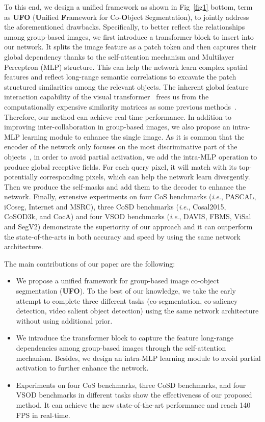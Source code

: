 \documentclass[journal]{IEEEtran}
\newcommand{\ie}{\textit{i}.\textit{e}., }
\begin{document}
To this end, we design a unified framework as shown in Fig~\ref{fig1} bottom, term as \textbf{UFO} (\textbf{U}nified \textbf{F}ramework for Co-\textbf{O}bject Segmentation), to jointly address the aforementioned drawbacks. 
Specifically, to better reflect the relationships among group-based images, we first introduce a transformer block to insert into our network. It splits the image feature as a patch token and then captures their global dependency thanks to the self-attention mechanism and Multilayer Perceptron (MLP) structure. This can help the network learn complex spatial features and reflect long-range semantic correlations to excavate the patch structured similarities among the relevant objects.
The inherent global feature interaction capability of the visual transformer~\cite{dosovitskiy2020image} frees us from the computationally expensive similarity matrices as some previous methods~\cite{zhang2020deep}. Therefore, our method can achieve real-time performance.
In addition to improving inter-collaboration in group-based images, we also propose an intra-MLP learning module to enhance the single image.
As it is common that the encoder of the network only focuses on the most discriminative part of the objects~\cite{zhou2016learning}, in order to avoid partial activation, we add the intra-MLP operation to produce global receptive fields. For each query pixel, it will match with its top- potentially corresponding pixels, which can help the network learn divergently. Then we produce the self-masks and add them to the decoder to enhance the network.
Finally, extensive experiments on four CoS benchmarks (\ie PASCAL, iCoseg, Internet and MSRC), three CoSD benchmarks (\ie Cosal2015, CoSOD3k, and CocA) and four VSOD benchmarks (\ie DAVIS, FBMS, ViSal and SegV2)  demonstrate the superiority of our approach and it can outperform the state-of-the-arts in both accuracy and speed by using the same network architecture.

The main contributions of our paper are the following:
\begin{itemize}
\item We propose a unified framework for group-based image co-object segmentation (\textbf{UFO}). To the best of our knowledge, we take the early attempt to complete three different tasks (co-segmentation, co-saliency detection, video salient object detection) using the same network architecture without using additional prior. 
\item We introduce the transformer block to capture the feature long-range dependencies among group-based images through the self-attention mechanism. Besides, we design an intra-MLP learning module to avoid partial activation to further enhance the network.
\item Experiments on four CoS benchmarks, three CoSD benchmarks, and four VSOD benchmarks in different tasks show the effectiveness of our proposed method. It can achieve the new state-of-the-art performance and reach 140 FPS in real-time.
\end{itemize}
\end{document}
